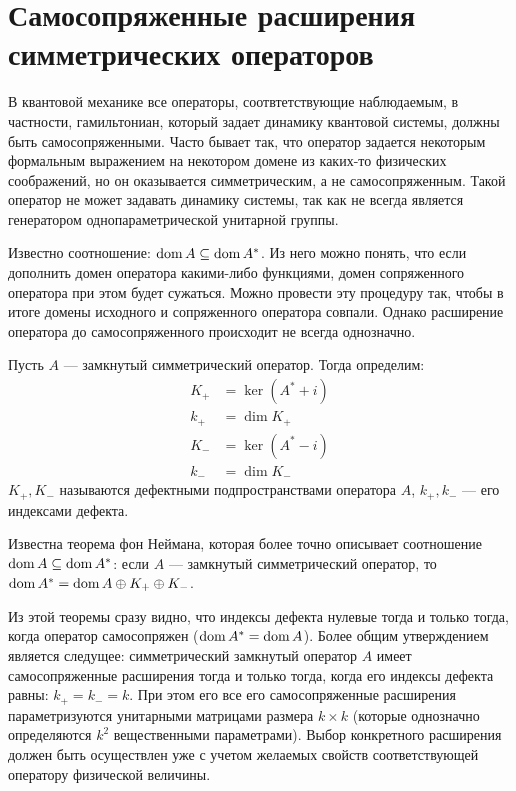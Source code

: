 \section{Самосопряженные расширения симметрических операторов}
В квантовой механике все операторы, соотвтетствующие наблюдаемым, в частности, гамильтониан, который задает динамику квантовой системы, должны быть самосопряженными. Часто бывает так, что оператор задается некоторым формальным выражением на некотором домене из каких-то физических соображений, но он оказывается симметрическим, а не самосопряженным. Такой оператор не может задавать динамику системы, так как не всегда является генератором однопараметрической унитарной группы.

Известно соотношение: $\operatorname{dom} A \subseteq \operatorname{dom} A^*$. Из него можно понять, что если дополнить домен оператора какими-либо функциями, домен сопряженного оператора при этом будет сужаться. Можно провести эту процедуру так, чтобы в итоге домены исходного и сопряженного оператора совпали. Однако расширение оператора до самосопряженного происходит не всегда однозначно.

Пусть $A$ — замкнутый симметрический оператор. Тогда определим:
\begin{align*}
K_+ &= \ker (A^* + i) \\
k_+ &= \dim K_+ \\
K_- &= \ker (A^* - i) \\
k_- &= \dim K_-
\end{align*}
$K_+, K_-$ называются дефектными подпространствами оператора $A$, $k_+, k_-$ — его индексами дефекта.

Известна теорема фон Неймана, которая более точно описывает соотношение $\operatorname{dom} A \subseteq \operatorname{dom} A^*$: если $A$ — замкнутый симметрический оператор, то $\operatorname{dom} A^* = \operatorname{dom} A \oplus K_+ \oplus K_-$.

Из этой теоремы сразу видно, что индексы дефекта нулевые тогда и только тогда, когда оператор самосопряжен ($\operatorname{dom} A^* = \operatorname{dom} A$). Более общим утверждением является следущее: симметрический замкнутый оператор $A$ имеет самосопряженные расширения тогда и только тогда, когда его индексы дефекта равны: $k_+ = k_- = k$. При этом его все его самосопряженные расширения параметризуются унитарными матрицами размера $k \times k$ (которые однозначно определяются $k^2$ вещественными параметрами). Выбор конкретного расширения должен быть осуществлен уже с учетом желаемых свойств соответствующей оператору физической величины.
